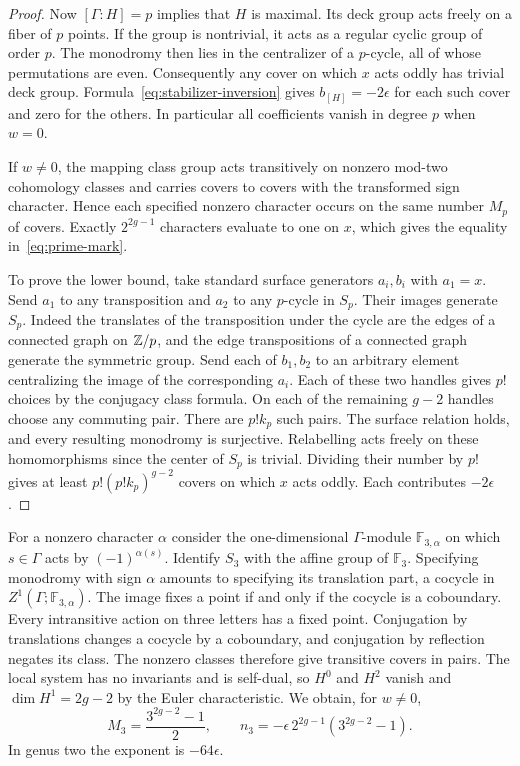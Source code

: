 \begin{proof}
Now $[\Gamma:H]=p$ implies that $H$ is maximal. Its deck group
acts freely on a fiber of $p$ points. If the group is nontrivial,
it acts as a regular cyclic group of order $p$. The monodromy then
lies in the centralizer of a $p$-cycle, all of whose permutations
are even. Consequently any cover on which $x$ acts oddly has trivial
deck group. Formula~\eqref{eq:stabilizer-inversion} gives
$b_{[H]}=-2\epsilon$ for each such cover and zero for the others.
In particular all coefficients vanish in degree $p$ when $w=0$.

If $w\ne0$, the mapping class group acts transitively on nonzero
mod-two cohomology classes and carries covers to covers with the
transformed sign character. Hence each specified nonzero character
occurs on the same number $M_p$ of covers. Exactly $2^{2g-1}$
characters evaluate to one on $x$, which gives the equality
in~\eqref{eq:prime-mark}.

To prove the lower bound, take standard surface generators $a_i,b_i$
with $a_1=x$. Send $a_1$ to any transposition and $a_2$ to any
$p$-cycle in $S_p$. Their images generate $S_p$. Indeed the translates
of the transposition under the cycle are the edges of a connected
graph on $\mathbb Z/p$, and the edge transpositions of a connected graph
generate the symmetric group. Send each of $b_1,b_2$ to an arbitrary
element centralizing the image of the corresponding $a_i$. Each of
these two handles gives $p!$ choices by the conjugacy class formula.
On each of the remaining $g-2$ handles choose any commuting pair.
There are $p!k_p$ such pairs. The surface relation holds, and every
resulting monodromy is surjective. Relabelling acts freely on these
homomorphisms since the center of $S_p$ is trivial. Dividing their
number by $p!$ gives at least $p!(p!k_p)^{g-2}$ covers on which $x$
acts oddly. Each contributes $-2\epsilon$.
\end{proof}

\begin{example}
For a nonzero character $\alpha$ consider the one-dimensional
$\Gamma$-module $\mathbb F_{3,\alpha}$ on which $s\in\Gamma$ acts
by $(-1)^{\alpha(s)}$. Identify $S_3$ with the affine group of
$\mathbb F_3$. Specifying monodromy with sign $\alpha$ amounts to
specifying its translation part, a cocycle in
$Z^1(\Gamma;\mathbb F_{3,\alpha})$. The image fixes a point if and
only if the cocycle is a coboundary. Every intransitive action on
three letters has a fixed point. Conjugation by translations changes
a cocycle by a coboundary, and conjugation by reflection negates its
class. The nonzero classes therefore give transitive covers in pairs.
The local system has no invariants and is self-dual, so $H^0$ and
$H^2$ vanish and $\dim H^1=2g-2$ by the Euler characteristic.
We obtain, for $w\ne0$,
\[
 M_3=\frac{3^{2g-2}-1}{2},\qquad
 n_3=-\epsilon\,2^{2g-1}(3^{2g-2}-1).
\]
In genus two the exponent is $-64\epsilon$.
\end{example}

